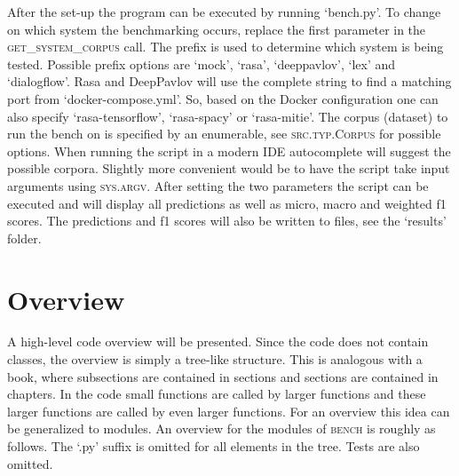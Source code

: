 After the set-up the program can be executed by running `bench.py'.
To change on which system the benchmarking occurs, replace the first parameter in the \textsc{get\_system\_corpus} call.
The prefix is used to determine which system is being tested.
Possible prefix options are `mock', `rasa', `deeppavlov', `lex' and `dialogflow'.
Rasa and DeepPavlov will use the complete string to find a matching port from `docker-compose.yml'.
So, based on the Docker configuration one can also specify `rasa-tensorflow', `rasa-spacy' or `rasa-mitie'.
The corpus (dataset) to run the bench on is specified by an enumerable, see \textsc{src.typ.Corpus} for possible options.
When running the script in a modern IDE autocomplete will suggest the possible corpora.
Slightly more convenient would be to have the script take input arguments using \textsc{sys.argv}.
After setting the two parameters the script can be executed and will display all predictions as well as micro, macro and weighted f1 scores.
The predictions and f1 scores will also be written to files, see the `results' folder.

\section{Overview}
\label{sec:overview}
A high-level code overview will be presented.
Since the code does not contain classes, the overview is simply a tree-like structure.
This is analogous with a book, where subsections are contained in sections and sections are contained in chapters.
In the code small functions are called by larger functions and these larger functions are called by even larger functions.
For an overview this idea can be generalized to modules.
An overview for the modules of \textsc{bench} is roughly as follows.
The `.py' suffix is omitted for all elements in the tree.
Tests are also omitted.

